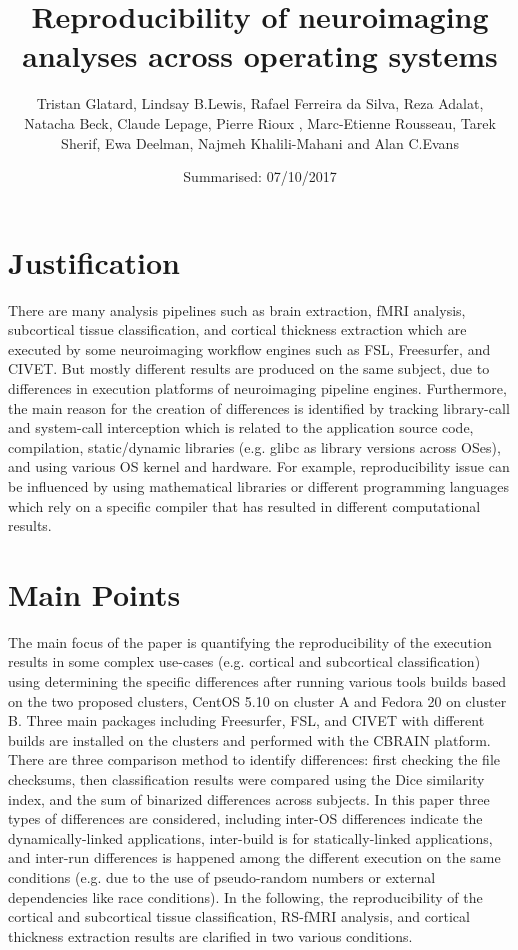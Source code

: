 \documentclass[a4paper]{article}
\title{Reproducibility of neuroimaging analyses across operating systems}
\date{Summarised: 07/10/2017}
\author{Tristan Glatard, Lindsay B.Lewis, Rafael Ferreira da Silva, Reza Adalat, \\
Natacha Beck, Claude Lepage, Pierre Rioux , Marc-Etienne Rousseau, Tarek Sherif, Ewa Deelman, Najmeh Khalili-Mahani and Alan C.Evans}
\begin{document}
\maketitle
\section{Justification}
\begin{itemize}
There are many analysis pipelines such as brain extraction, fMRI analysis, subcortical tissue classification, and cortical thickness extraction which are executed by some neuroimaging workflow engines such as FSL, Freesurfer, and CIVET. But mostly different results are produced on the same subject, due to differences in execution platforms of neuroimaging pipeline engines. Furthermore, the main reason for the creation of differences is identified by tracking library-call and system-call interception which is related to the application source code, compilation, static/dynamic libraries (e.g. glibc as library versions across OSes), and using various OS kernel and hardware. For example, reproducibility issue can be influenced by using mathematical libraries or different programming languages which rely on a specific compiler that has resulted in different computational results.
 
\end{itemize}

\section{Main Points}
\begin{itemize}
The main focus of the paper is quantifying the reproducibility of the execution results in some complex use-cases (e.g. cortical and subcortical classification) using determining the specific differences after running various tools builds based on the two proposed clusters, CentOS 5.10 on cluster A and Fedora 20 on cluster B. Three main packages including Freesurfer, FSL, and CIVET with different builds are installed on the clusters and performed with the CBRAIN platform.
There are three comparison method to identify differences:  first checking the file checksums, then classification results were compared using the Dice similarity index, and the sum of binarized differences across subjects.
In this paper three types of differences are considered, including inter-OS differences indicate the dynamically-linked applications, inter-build is for statically-linked applications, and inter-run differences is happened among the different execution on the same conditions (e.g.  due to the use of pseudo-random numbers or external dependencies like race conditions). In the following, the reproducibility of the cortical and subcortical tissue classification, RS-fMRI analysis, and cortical thickness extraction results are clarified in two various conditions. 

\end{itemize}
\end{document}
